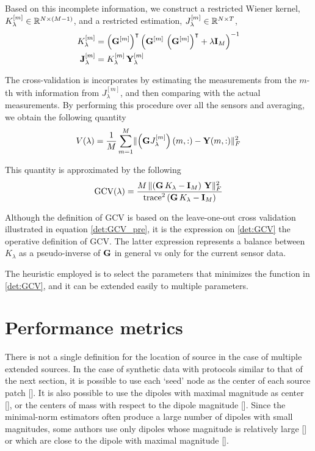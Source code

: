 Based on this incomplete information, we construct a restricted Wiener kernel, $K_\lambda^{[m]} \in \mathbb{R}^{N\times(M-1)}$, and a restricted estimation, $J_\lambda^{[m]} \in \mathbb{R}^{N\times T}$,
\begin{align}
K_\lambda^{[m]}
&=
\left( \mathbf{G}^{[m]} \right)^\intercal\left(  \mathbf{G}^{[m]}\, \left( \mathbf{G}^{[m]} \right)^\intercal + \lambda\mathbf{I}_M  \right)^{-1}
\\
\mathbf{J}_\lambda^{[m]}
&=
K_\lambda^{[m]}\, \mathbf{Y}_\lambda^{[m]}
\end{align}

The cross-validation is incorporates by estimating the measurements from the $m$-th with information from $J_\lambda^{[m]}$, and then comparing with the actual measurements.
%
By performing this procedure over all the sensors and averaging, we obtain the following quantity
\begin{equation}
V(\lambda) = 
\frac{1}{M}
\sum_{m=1}^M
\lVert  \left(  \mathbf{G} J_\lambda^{[m]}  \right)(m, :) - \mathbf{Y}(m,:)  \rVert_F^2
\label{det:GCV_pre}
\end{equation}

This quantity is approximated by the following
\begin{equation}
\text{GCV}(\lambda) = 
\frac{M\, \lVert \left( \mathbf{G}\, K_\lambda -\mathbf{I}_M  \right)\, \mathbf{Y} \rVert_F^2}{\text{trace}^2\left( \mathbf{G}\, K_\lambda - \mathbf{I}_M \right)}
\label{det:GCV}
\end{equation}

Although the definition of GCV is based on the leave-one-out cross validation illustrated in equation \eqref{det:GCV_pre}, it is the expression on \eqref{det:GCV} the operative definition of GCV.
%
The latter expression represents a balance between $K_\lambda$ as a pseudo-inverse of $\mathbf{G}$ in general vs only for the current sensor data.

The heuristic employed is to select the parameters that minimizes the function in \eqref{det:GCV}, and it can be extended easily to multiple parameters.


\section{Performance metrics}

There is not a single definition for the location of source in the case of  multiple extended sources.
%
In the case of synthetic data with protocols similar to that of the next section, it is possible to use each `seed' node as the center of each source patch [].
%
It is also possible to use the dipoles with maximal magnitude as center [], or the centers of mass with respect to the dipole magnitude [].
%
Since the minimal-norm estimators often produce a large number of dipoles with small magnitudes, some authors use only dipoles whose magnitude is relatively large [] or which are close to the dipole with maximal magnitude [].

